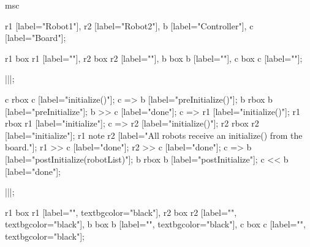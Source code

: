 \begin{msc}
msc
{

r1 [label="Robot1"],
r2 [label="Robot2"],
b [label="Controller"],
c [label="Board"];

r1 box r1 [label=""],
r2 box r2 [label=""],
b box b [label=""],
c box c [label=""];

|||;

c rbox c [label="initialize()"];
c => b [label="preInitialize()"];
b rbox b [label="preInitialize"];
b >> c [label="done"];
c => r1 [label="initialize()"];
r1 rbox r1 [label="initialize"];
c => r2 [label="initialize()"];
r2 rbox r2 [label="initialize"];
r1 note r2 [label="All robots receive an initialize() from the board."];
r1 >> c [label="done"];
r2 >> c [label="done"];
c => b [label="postInitialize(robotList)"];
b rbox b [label="postInitialize"];
c << b [label="done"];

|||;

r1 box r1 [label="", textbgcolor="black"],
r2 box r2 [label="", textbgcolor="black"],
b box b [label="", textbgcolor="black"],
c box c [label="", textbgcolor="black"];

}
\end{msc}
